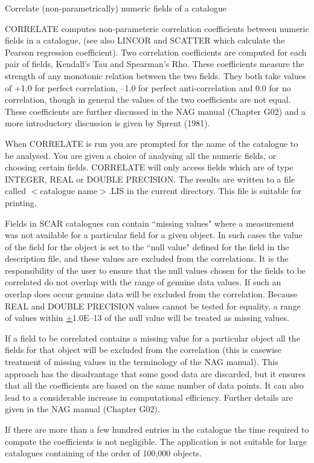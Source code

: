 Correlate (non-parametrically) numeric fields of a catalogue

CORRELATE computes non-parameteric correlation coefficients
between numeric fields in a catalogue, (see also LINCOR and SCATTER
which calculate the Pearson regression coefficient).
Two correlation coefficients are computed for each pair of fields,
Kendall's Tau and Spearman's Rho.
These coefficients measure the strength of any monotonic relation
between the two fields.
They both take values of +1.0 for perfect correlation, --1.0 for perfect
anti-correlation and 0.0 for no correlation, though in general the
values of the two coefficients are not equal.
These coefficients are further discussed in the NAG manual (Chapter G02)
and a more introductory discussion is given by Sprent (1981).

When CORRELATE is run you are prompted for the name of the catalogue
to be analysed.
You are given a choice of analysing all the numeric fields, or choosing
certain fields.
CORRELATE will only access fields which are of type INTEGER, REAL
or DOUBLE PRECISION.
The results are written to a file called $<$catalogue name$>$.LIS
in the current directory.
This file is suitable for printing.

Fields in SCAR catalogues can contain ``missing values" where a
measurement was not available for a particular field for a given
object.
In such cases the value of the field for the object is
set to the ``null value" defined for the field in the description
file, and these values are excluded from the correlations.
It is the responsibility of the user to ensure that the null values
chosen for the fields to be correlated do not overlap with
the range of genuine data values.
If such an overlap does occur genuine data will be excluded from
the correlation.
Because REAL and DOUBLE PRECISION values cannot be tested for equality,
a range of values within \underline{+}1.0E--13 of the null value will
be treated as missing values.

If a field to be correlated contains a missing value for a
particular object all the fields for that object will be excluded
from the correlation (this is casewise treatment of missing values
in the terminology of the NAG manual).
This approach has the disadvantage that some good data are discarded,
but it ensures that all the coefficients are based on the same number
of data points.
It can also lead to a considerable increase in computational efficiency.
Further details are given in the NAG manual (Chapter G02).

If there are more than a few hundred entries in the catalogue the
time required to compute the coefficients is not negligible.
The application is not suitable for large catalogues containing
of the order of 100,000 objects.

